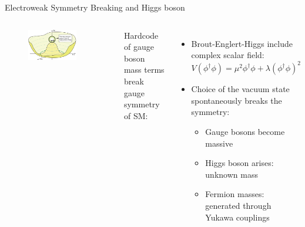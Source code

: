 \begin{frame}{Electroweak Symmetry Breaking and Higgs boson}
\begin{columns}
\begin{figure}
    \centering
    \includegraphics[width=0.8\textwidth]{Part1/Img/Higgs-Potential-lookdown.png}
\end{figure}
Hardcode of gauge boson mass terms break gauge symmetry of SM:
\begin{itemize}
    \item \textcolor{structurColor}{Brout-Englert-Higgs} include complex scalar field:
    \begin{equation*}
        V(\phi^\dagger\phi) = \mu^2\phi^\dagger\phi + \lambda(\phi^\dagger\phi)^2
    \end{equation*}
    \pause
    \item Choice of the vacuum state \textcolor{applegreen}{spontaneously breaks the symmetry}:
    \begin{itemize}
        \item Gauge bosons become massive
        \item Higgs boson arises: unknown mass
        \item Fermion masses: generated through Yukawa couplings
    \end{itemize}
\end{itemize}


\end{columns}
\end{frame}
